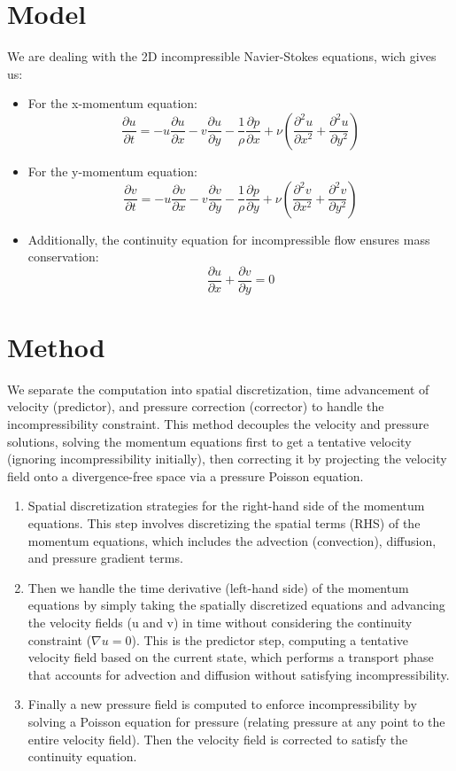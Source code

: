 \section{Model}
We are dealing with the 2D incompressible Navier-Stokes equations, wich gives us:

\begin{itemize}
  \item For the x-momentum equation:
  \[ \frac{\partial u}{\partial t} = -u \frac{\partial u}{\partial x} - v \frac{\partial u}{\partial y} - \frac{1}{\rho} \frac{\partial p}{\partial x} + \nu \left( \frac{\partial^2 u}{\partial x^2} + \frac{\partial^2 u}{\partial y^2} \right) \]
  \item For the y-momentum equation:
  \[ \frac{\partial v}{\partial t} = -u \frac{\partial v}{\partial x} - v \frac{\partial v}{\partial y} - \frac{1}{\rho} \frac{\partial p}{\partial y} + \nu \left( \frac{\partial^2 v}{\partial x^2} + \frac{\partial^2 v}{\partial y^2} \right) \]
  \item Additionally, the continuity equation for incompressible flow ensures mass conservation:
  \[ \frac{\partial u}{\partial x} + \frac{\partial v}{\partial y} = 0 \]
\end{itemize}

\section{Method}

We separate the computation into spatial discretization, time advancement of velocity (predictor), and pressure correction (corrector) to handle the incompressibility constraint.
This method decouples the velocity and pressure solutions, solving the momentum equations first to get a tentative velocity (ignoring incompressibility initially), then correcting it by projecting the velocity field onto a divergence-free space via a pressure Poisson equation.

\begin{enumerate}
    \item Spatial discretization strategies for the right-hand side of the momentum equations. This step involves discretizing the spatial terms (RHS) of the momentum equations, which includes the advection (convection), diffusion, and pressure gradient terms.
    \item Then we handle the time derivative (left-hand side) of the momentum equations by simply taking the spatially discretized equations and advancing the velocity fields (u and v) in time without considering the continuity constraint ($\nabla u=0$). This is the predictor step, computing a tentative velocity field based on the current state, which performs a transport phase that accounts for advection and diffusion without satisfying incompressibility.
    \item Finally a new pressure field is computed to enforce incompressibility by solving a Poisson equation for pressure (relating pressure at any point to the entire velocity field). Then the velocity field is corrected to satisfy the continuity equation.
\end{enumerate}

